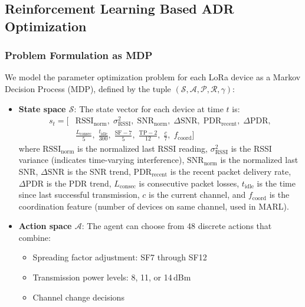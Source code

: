 \documentclass[12pt,a4paper]{article}
\begin{document}
\subsection{Reinforcement Learning Based ADR Optimization}
\label{subsec:rl_adr}
\subsubsection{Problem Formulation as MDP}

We model the parameter optimization problem for each LoRa device as a Markov Decision Process (MDP), defined by the tuple $(\mathcal{S}, \mathcal{A}, \mathcal{P}, \mathcal{R}, \gamma)$:

\begin{itemize}
    \item \textbf{State space $\mathcal{S}$}: The state vector for each device at time $t$ is:
      \begin{equation}
    \begin{aligned}
        s_t = \Big[
        &\text{RSSI}_{\text{norm}},\;
        \sigma^2_{\text{RSSI}},\;
        \text{SNR}_{\text{norm}},\;
        \Delta\text{SNR},\;
        \text{PDR}_{\text{recent}},\;
        \Delta\text{PDR}, \\
        &\frac{L_{\text{consec}}}{5},\;
        \frac{t_{\text{idle}}}{300},\;
        \frac{\text{SF}-7}{5},\;
        \frac{\text{TP}-2}{12},\;
        \frac{c}{7},\;
        f_{\text{coord}}
        \Big]
    \end{aligned}
    \label{eq:state_vector}
    \end{equation}
    where $\text{RSSI}_{\text{norm}}$ is the normalized last RSSI reading, $\sigma^2_{\text{RSSI}}$ is the RSSI variance (indicates time-varying interference), $\text{SNR}_{\text{norm}}$ is the normalized last SNR, $\Delta\text{SNR}$ is the SNR trend, $\text{PDR}_{\text{recent}}$ is the recent packet delivery rate, $\Delta\text{PDR}$ is the PDR trend, $L_{\text{consec}}$ is consecutive packet losses, $t_{\text{idle}}$ is the time since last successful transmission, $c$ is the current channel, and $f_{\text{coord}}$ is the coordination feature (number of devices on same channel, used in MARL).

    \item \textbf{Action space $\mathcal{A}$}: The agent can choose from 48 discrete actions that combine:
    \begin{itemize}
        \item Spreading factor adjustment: SF7 through SF12
        \item Transmission power levels: 8, 11, or 14\,dBm
        \item Channel change decisions
    \end{itemize}


\end{itemize}
\end{document}
